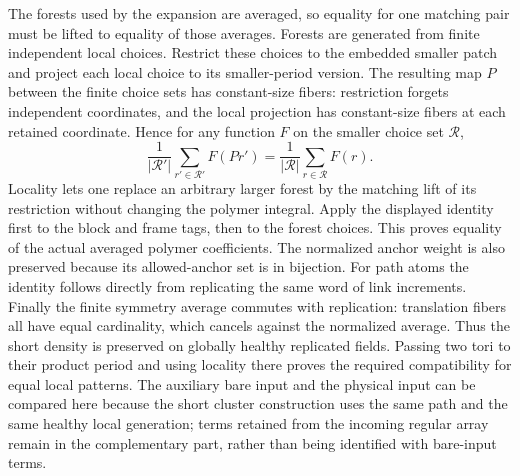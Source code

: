 The forests used by the expansion are averaged, so equality for one
matching pair must be lifted to equality of those averages. Forests
are generated from finite independent local choices. Restrict these
choices to the embedded smaller patch and project each local choice
to its smaller-period version. The resulting map $P$ between the
finite choice sets has constant-size fibers: restriction forgets
independent coordinates, and the local projection has constant-size
fibers at each retained coordinate. Hence for any function $F$ on
the smaller choice set $\mathcal R$,
\[
 \frac1{|\mathcal R'|}\sum_{r'\in\mathcal R'}F(P r')
                  =\frac1{|\mathcal R|}\sum_{r\in\mathcal R}F(r).
\]
Locality lets one replace an arbitrary larger forest by the matching
lift of its restriction without changing the polymer integral.
Apply the displayed identity first to the block and frame tags,
then to the forest choices. This proves equality of the actual
averaged polymer coefficients. The normalized anchor weight is also
preserved because its allowed-anchor set is in bijection. For path atoms the identity follows directly from
replicating the same word of link increments. Finally the finite
symmetry average commutes with replication: translation fibers all
have equal cardinality, which cancels against the normalized average.
Thus the short density is preserved on globally healthy replicated
fields. Passing two tori to their product period and using locality
there proves the required compatibility for equal local patterns.
The auxiliary bare input and the physical input can be compared here
because the short cluster construction uses the same path and the
same healthy local generation; terms retained from the incoming
regular array remain in the complementary part, rather than being
identified with bare-input terms.

